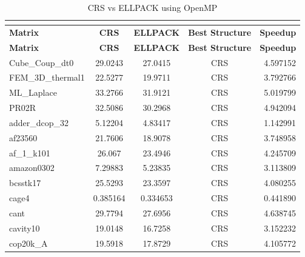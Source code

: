 \documentclass[12pt,oneside]{book} %
\begin{document}
\begin{longtable}{lcccr}
    \caption{CRS vs ELLPACK using OpenMP}                                                            \\
    \label{tab:crsvsellpackopenmp}                                                                   \\
    \toprule
    \textbf{Matrix}   & \textbf{CRS} & \textbf{ELLPACK} & \textbf{Best Structure} & \textbf{Speedup} \\
    \midrule
    \endfirsthead
    \toprule
    \textbf{Matrix}   & \textbf{CRS} & \textbf{ELLPACK} & \textbf{Best Structure} & \textbf{Speedup} \\
    \midrule
    \endhead
    \bottomrule
    \endfoot
    Cube\_Coup\_dt0   & 29.0243      & 27.0415          & CRS                     & 4.597152         \\
    FEM\_3D\_thermal1 & 22.5277      & 19.9711          & CRS                     & 3.792766         \\
    ML\_Laplace       & 33.2766      & 31.9121          & CRS                     & 5.019799         \\
    PR02R             & 32.5086      & 30.2968          & CRS                     & 4.942094         \\
    adder\_dcop\_32   & 5.12204      & 4.83417          & CRS                     & 1.142991         \\
    af23560           & 21.7606      & 18.9078          & CRS                     & 3.748958         \\
    af\_1\_k101       & 26.067       & 23.4946          & CRS                     & 4.245709         \\
    amazon0302        & 7.29883      & 5.23835          & CRS                     & 3.113809         \\
    bcsstk17          & 25.5293      & 23.3597          & CRS                     & 4.080255         \\
    cage4             & 0.385164     & 0.334653         & CRS                     & 0.441890         \\
    cant              & 29.7794      & 27.6956          & CRS                     & 4.638745         \\
    cavity10          & 19.0148      & 16.7258          & CRS                     & 3.152232         \\
    cop20k\_A         & 19.5918      & 17.8729          & CRS                     & 4.105772         \\

\end{longtable}
\end{document}
